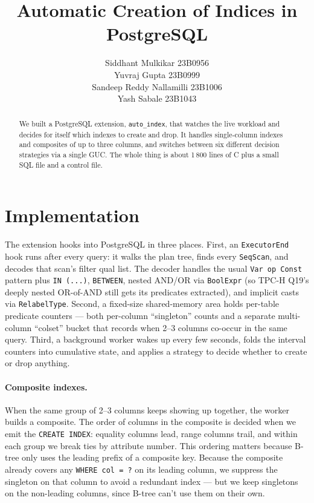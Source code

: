 \documentclass[10pt,a4paper]{article}
\title{\textbf{Automatic Creation of Indices in PostgreSQL}}
\author{
    Siddhant Mulkikar 23B0956 \\
    Yuvraj Gupta 23B0999 \\
    Sandeep Reddy Nallamilli 23B1006 \\
    Yash Sabale 23B1043
}
\date{}
\newcommand{\code}[1]{\texttt{\small #1}}
\begin{document}
\maketitle
\vspace{-2em}

\begin{abstract}
\noindent
We built a PostgreSQL extension, \code{auto\_index}, that watches the
live workload and decides for itself which indexes to create and drop.
It handles single-column indexes and composites of up to three
columns, and switches between six different decision strategies via a
single GUC. The whole thing is about 1\,800 lines of C plus a small
SQL file and a control file.
\end{abstract}

\section{Implementation}

The extension hooks into PostgreSQL in three places. First, an
\code{ExecutorEnd} hook runs after every query: it walks the plan
tree, finds every \code{SeqScan}, and decodes that scan's filter
qual list. The decoder handles the usual \code{Var op Const} pattern
plus \code{IN (...)}, \code{BETWEEN}, nested AND/OR via
\code{BoolExpr} (so TPC-H Q19's deeply nested OR-of-AND still gets
its predicates extracted), and implicit casts via \code{RelabelType}.
Second, a fixed-size shared-memory area holds per-table predicate
counters --- both per-column ``singleton'' counts and a separate
multi-column ``colset'' bucket that records when 2--3 columns
co-occur in the same query. Third, a background worker wakes up
every few seconds, folds the interval counters into cumulative
state, and applies a strategy to decide whether to create or drop
anything.

\paragraph{Composite indexes.} When the same group of 2--3 columns
keeps showing up together, the worker builds a composite. The order
of columns in the composite is decided when we emit the
\code{CREATE INDEX}: equality columns lead, range columns trail, and
within each group we break ties by attribute number. This ordering
matters because B-tree only uses the leading prefix of a composite
key. Because the composite already covers any \code{WHERE col = ?}
on its leading column, we suppress the singleton on that column to
avoid a redundant index --- but we keep singletons on the
non-leading columns, since B-tree can't use them on their own.
\end{document}
